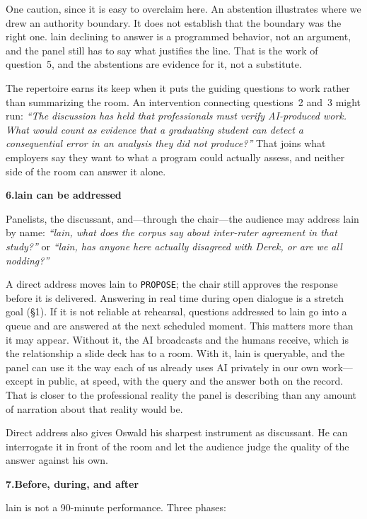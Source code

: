 \documentclass[11pt]{article}
\newcommand{\fieldlabel}[2][]{%
  \par\addvspace{1.25em}\Needspace{8\baselineskip}%
  \noindent\begin{minipage}{\linewidth}%
    {\NotoHeading\bfseries\large\color{ContentPrimary}#2}%
    \hfill{\normalfont\footnotesize\color{ContentSecondary}#1}%
  \end{minipage}\par
  \vspace{0.2em}{\color{BorderModerate}\rule{\linewidth}{0.4pt}}\par
  \vspace{0.55em}%
}
\begin{document}
One caution, since it is easy to overclaim here. An abstention illustrates where
we drew an authority boundary. It does not establish that the boundary was the
right one. lain declining to answer is a programmed behavior, not an argument,
and the panel still has to say what justifies the line. That is the work of
question~5, and the abstentions are evidence for it, not a substitute.

The repertoire earns its keep when it puts the guiding questions to work rather
than summarizing the room. An intervention connecting questions~2 and~3 might
run: \emph{``The discussion has held that professionals must verify AI-produced
work. What would count as evidence that a graduating student can detect a
consequential error in an analysis they did not produce?''} That joins what
employers say they want to what a program could actually assess, and neither
side of the room can answer it alone.

\fieldlabel{6.\quad lain can be addressed}

Panelists, the discussant, and---through the chair---the audience may address
lain by name: \emph{``lain, what does the corpus say about inter-rater agreement
in that study?''} or \emph{``lain, has anyone here actually disagreed with
Derek, or are we all nodding?''}

A direct address moves lain to \texttt{PROPOSE}; the chair still approves
the response before it is delivered. Answering in real time during open dialogue
is a stretch goal (\S1). If it is not reliable at rehearsal, questions addressed
to lain go into a queue and are answered at the next scheduled moment. This matters more than it may appear. Without
it, the AI broadcasts and the humans receive, which is the relationship a slide
deck has to a room. With it, lain is queryable, and the panel can use it the
way each of us already uses AI privately in our own work---except in public,
at speed, with the query and the answer both on the record. That is closer to
the professional reality the panel is describing than any amount of narration
about that reality would be.

Direct address also gives Oswald his sharpest instrument as discussant. He can
interrogate it in front of the room and let the audience judge the quality of
the answer against his own.

\fieldlabel{7.\quad Before, during, and after}

lain is not a 90-minute performance. Three phases:
\end{document}
